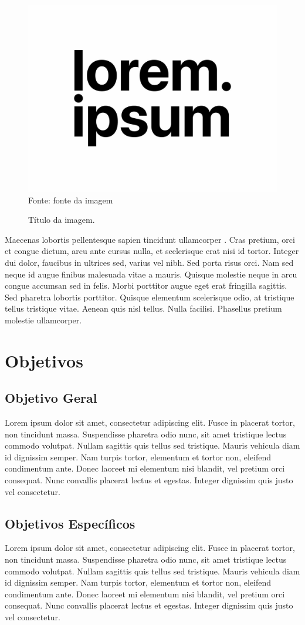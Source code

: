 \documentclass[a4paper, 12pt]{article}
\begin{document}
\begin{figure}[!htb]
    \centering
    \caption{Título da imagem.}
    \includegraphics[width=0.5\linewidth]{imagens/image.png}\\
    {\footnotesize Fonte: fonte da imagem \cite{amet2023web}}
    \label{fig:enter-label}
\end{figure}

Maecenas lobortis pellentesque sapien tincidunt ullamcorper \cite{sint2024thesis}.
Cras pretium, orci et congue dictum, arcu ante cursus nulla, et scelerisque erat nisi id tortor.
Integer dui dolor, faucibus in ultrices sed, varius vel nibh.
Sed porta risus orci. Nam sed neque id augue finibus malesuada vitae a mauris.
Quisque molestie neque in arcu congue accumsan sed in felis.
Morbi porttitor augue eget erat fringilla sagittis.
Sed pharetra lobortis porttitor.
Quisque elementum scelerisque odio, at tristique tellus tristique vitae.
Aenean quis nisl tellus.
Nulla facilisi.
Phasellus pretium molestie ullamcorper.


\section{Objetivos}
\subsection{Objetivo Geral}
Lorem ipsum dolor sit amet, consectetur adipiscing elit. Fusce in placerat tortor, non tincidunt massa. Suspendisse pharetra odio nunc, sit amet tristique lectus commodo volutpat. Nullam sagittis quis tellus sed tristique. Mauris vehicula diam id dignissim semper. Nam turpis tortor, elementum et tortor non, eleifend condimentum ante. Donec laoreet mi elementum nisi blandit, vel pretium orci consequat. Nunc convallis placerat lectus et egestas. Integer dignissim quis justo vel consectetur.

\subsection{Objetivos Específicos}
Lorem ipsum dolor sit amet, consectetur adipiscing elit. Fusce in placerat tortor, non tincidunt massa. Suspendisse pharetra odio nunc, sit amet tristique lectus commodo volutpat. Nullam sagittis quis tellus sed tristique. Mauris vehicula diam id dignissim semper. Nam turpis tortor, elementum et tortor non, eleifend condimentum ante. Donec laoreet mi elementum nisi blandit, vel pretium orci consequat. Nunc convallis placerat lectus et egestas. Integer dignissim quis justo vel consectetur.
\end{document}
